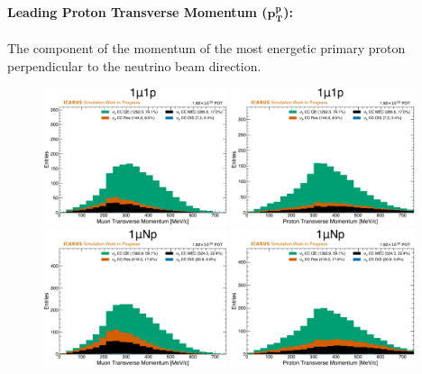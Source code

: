 \paragraph{Leading Proton Transverse Momentum ($\mathbf{p_T^p}$):}
The component of the momentum of the most energetic primary proton perpendicular to the neutrino beam direction.

\begin{figure}[!htb]
    \centering
    \includegraphics[width=0.48\textwidth]{figures/neutrino_selection/signal_hist1d_1mu1p_muon_pt.pdf}
    \includegraphics[width=0.48\textwidth]{figures/neutrino_selection/signal_hist1d_1mu1p_proton_pt.pdf}
    \\
    \includegraphics[width=0.48\textwidth]{figures/neutrino_selection/signal_hist1d_1muNp_muon_pt.pdf}
    \includegraphics[width=0.48\textwidth]{figures/neutrino_selection/signal_hist1d_1muNp_proton_pt.pdf}

\end{figure}
